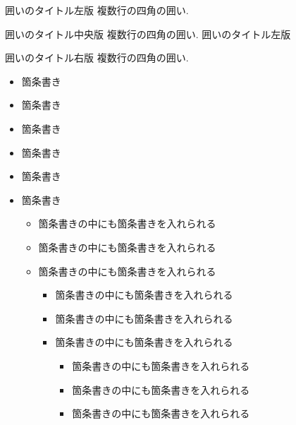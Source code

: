 \documentclass[titlepage, a4paper, 11pt, dvipdfmx]{jsarticle}
\begin{document}
\begin{itembox}[l]{囲いのタイトル左版}
複数行の四角の囲い.
\end{itembox}

\begin{itembox}[c]{囲いのタイトル中央版}
複数行の四角の囲い. 囲いのタイトル左版
\end{itembox}

\begin{itembox}[r]{囲いのタイトル右版}
複数行の四角の囲い.
\end{itembox}

\newpage

\begin{itemize}
\item 箇条書き
\item 箇条書き
\item 箇条書き
\end{itemize}

\begin{itemize}
\item 箇条書き
\item 箇条書き
\item 箇条書き

\begin{itemize}
\item 箇条書きの中にも箇条書きを入れられる
\item 箇条書きの中にも箇条書きを入れられる
\item 箇条書きの中にも箇条書きを入れられる

\begin{itemize}
\item 箇条書きの中にも箇条書きを入れられる
\item 箇条書きの中にも箇条書きを入れられる
\item 箇条書きの中にも箇条書きを入れられる

\begin{itemize}
\item 箇条書きの中にも箇条書きを入れられる
\item 箇条書きの中にも箇条書きを入れられる
\item 箇条書きの中にも箇条書きを入れられる
\end{itemize}

\end{itemize}

\end{itemize}

\end{itemize}
\end{document}
